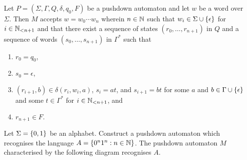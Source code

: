 Let \(P = (\Sigma, \Gamma, Q, \delta, q_0, F)\) be a pushdown automaton and let
\(w\) be a word over \(\Sigma\). Then \(M\) accepts \(w = w_0 \cdots w_n\)
wherein \(n \in \setnat\) such that \(w_i \in \Sigma \cup \set{\epsilon}\) for
\(i \in \Nln[n + 1]\) and that there exist a sequence of states \((r_0, \ldots,
r_{n + 1})\) in \(Q\) and a sequence of words \((s_0, \ldots, s_{n + 1})\) in
\(\Gamma^*\) such that
\begin{enumerate}
    \item \(r_0 = q_0\),
    \item \(s_0 = \epsilon\),
    \item \((r_{i + 1}, b) \in \delta(r_i, w_i, a)\), \(s_i = a t\), and \(s_{i
    + 1} = b t\) for some \(a\) and \(b \in \Gamma \cup \set{\epsilon}\) and
    some \(t \in \Gamma^*\) for \(i \in \Nln[n + 1]\), and
    \item \(r_{n + 1} \in F\).
\end{enumerate}

\Bxr
    Let \(\Sigma = \set{0, 1}\) be an alphabet. Construct a pushdown automaton
    which recognises the language \(A = \set{0^n 1^n : n \in \setnat}\).
\Exr
\Bsl
    The pushdown automaton \(M\) characterised by the following diagram
    recognises \(A\).
    \begin{figure}[!h]
        \centering
    \end{figure}


